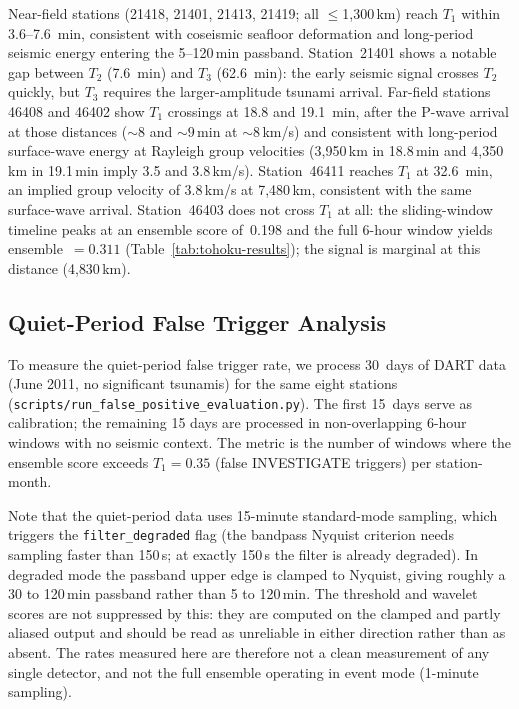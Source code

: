 \documentclass{article}
\begin{document}
Near-field stations (21418, 21401, 21413, 21419; all $\le$1{,}300\,km) reach $T_1$ within
3.6--7.6~min, consistent with coseismic seafloor deformation and
long-period seismic energy entering the 5--120\,min passband.
Station~21401 shows a notable gap between $T_2$ (7.6~min) and $T_3$
(62.6~min): the early seismic signal crosses $T_2$ quickly, but
$T_3$ requires the larger-amplitude tsunami arrival.
Far-field stations 46408 and 46402 show $T_1$ crossings at 18.8 and
19.1~min, after the P-wave arrival at those distances
(${\sim}8$ and ${\sim}9$\,min at ${\sim}8$\,km/s) and consistent
with long-period surface-wave energy at Rayleigh group velocities
(3{,}950\,km in 18.8\,min and 4{,}350\,km in 19.1\,min imply
3.5 and 3.8\,km/s).
Station~46411 reaches $T_1$ at 32.6~min, an implied group velocity
of 3.8\,km/s at 7{,}480\,km, consistent with the same surface-wave
arrival.
Station~46403 does not cross $T_1$ at all: the sliding-window
timeline peaks at an ensemble score of~0.198 and the full 6-hour
window yields ensemble~$= 0.311$ (Table~\ref{tab:tohoku-results});
the signal is marginal at this distance (4{,}830\,km).

\FloatBarrier
\subsection{Quiet-Period False Trigger Analysis}
\label{sec:eval-false-positive}

To measure the quiet-period false trigger rate, we process 30~days of
DART data (June 2011, no significant tsunamis) for the same eight
stations (\texttt{scripts/run\_false\_positive\_evaluation.py}).
The first 15~days serve as calibration; the remaining 15 days
are processed in non-overlapping 6-hour windows with no seismic
context. The metric is the number of windows where the ensemble score
exceeds $T_1 = 0.35$ (false INVESTIGATE triggers) per station-month.

Note that the quiet-period data uses 15-minute standard-mode sampling,
which triggers the \texttt{filter\_degraded} flag (the bandpass Nyquist
criterion needs sampling faster than 150\,s; at exactly 150\,s the
filter is already degraded).  In degraded mode the
passband upper edge is clamped to Nyquist, giving roughly a 30 to
120\,min passband rather than 5 to 120\,min.  The threshold and
wavelet scores are not suppressed by this: they are computed on the
clamped and partly aliased output and should be read as unreliable in
either direction rather than as absent.  The rates measured here are
therefore not a clean measurement of any single detector, and not the
full ensemble operating in event mode (1-minute sampling).
\end{document}
